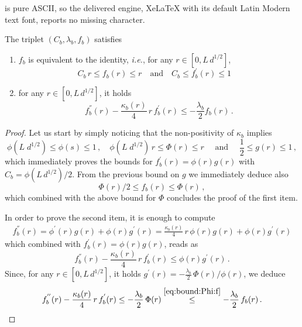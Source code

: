 \documentclass[10pt,a4paper]{amsart}
\newcommand{\ie}{i.e.\ }
\def\eqsp{\;}
\def\ie{\textit{i.e.}}
\newcommand{\bes}{\begin{equation}}
\newcommand{\ees}{\end{equation}}
\begin{document}
is pure ASCII, so the delivered engine, XeLaTeX with its default Latin Modern text font, reports no missing character.
\begin{proposition}\label{app:costruzione:f}
The triplet $(C_b,\lambda_b,f_b)$ satisfies
\begin{enumerate}
\item $f_b$ is equivalent to the identity, \ie, for any $ r\in[0,L \, d^{1/2}]$,
\bes C_b\,r\leq f_b(r)\leq r\quad\text{and}\quad C_b\leq f_b^{'}(r)\leq 1\quad \, \ees
\item for any $r\in[0,L\,d^{1/2}]$, it holds
\begin{equation}\label{eq:diff:f}
f^{''}_b(r)-\frac{\kappa_b(r)}{4}\,r\,f^{'}_b(r)\leq -\frac{\lambda_b}{2}f_b(r)\,.
\end{equation}
\end{enumerate}
\end{proposition}

\begin{proof}
Let us start by simply noticing that the non-positivity of $\kappa_b$ implies
\bes
\phi(L\eqsp d^{1/2})\leq \phi(s)\leq 1\,,\quad\phi(L\eqsp d^{1/2})\,r\leq \Phi(r)\leq r\quad\text{ and }\quad \frac12\leq g(r)\leq 1\,,
\ees
which immediately proves the bounds for $f_b^{'}(r)=\phi(r)g(r)$ with $C_b=\phi(L\,d^{1/2})/2$. From the previous bound on $g$ we immediately deduce also
\begin{equation}\label{eq:bound:Phi:f}
    \Phi(r)/2\leq f_b(r)\leq \Phi(r)\,,
\end{equation}
which combined with the above bound for $\Phi$ concludes the proof of the first item.

\medskip

In order to prove the second item, it is enough to compute
\bes 
\begin{split}
f_b^{''}(r)=\phi^{'}(r)g(r)+\phi(r)g^{'}(r)=\frac{\kappa_b(r)}{4}\,r\,\phi(r)g(r)+\phi(r)g^{'}(r)
\end{split}
\ees
which combined with  $f_b^{'}(r)=\phi(r) g(r)$, reads as
\bes
f^{''}_b(r)-\frac{\kappa_b(r)}{4}\,r\,f^{'}_b(r)\leq \phi(r)g^{'}(r)\,.
\ees
Since, for any $r\in[0,L\,d^{1/2}]$, it holds $g^{'}(r)= -\frac{\lambda_b}{2}\,\Phi(r)/\phi(r)$, we deduce  
\bes
f^{''}_b(r)-\frac{\kappa_b(r)}{4}\,r\,f^{'}_b(r)\leq -\frac{\lambda_b}{2}\,\Phi(r)\overset{\eqref{eq:bound:Phi:f}}{\leq} -\frac{\lambda_b}{2}\,f_b(r)\,.
\ees
\end{proof}
\end{document}
